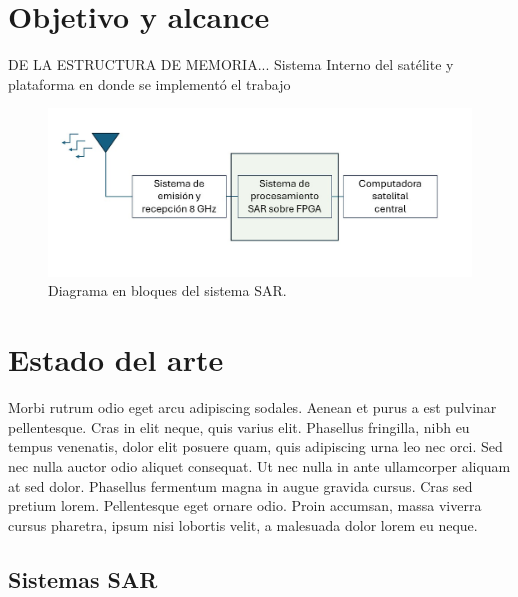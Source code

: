 \section{Objetivo y alcance}

DE LA ESTRUCTURA DE MEMORIA... Sistema Interno del satélite y plataforma en donde se implementó el trabajo

\begin{figure}[htpb]
\centering 
\includegraphics[width=.95\textwidth]{./Figuras/Diagrama Bloque Sistema.jpg}
\caption{Diagrama en bloques del sistema SAR.}
\label{fig:diagBloques}
\end{figure}

\vspace{25px}


\section{Estado del arte}
Morbi rutrum odio eget arcu adipiscing sodales. Aenean et purus a est pulvinar pellentesque. Cras in elit neque, quis varius elit. Phasellus fringilla, nibh eu tempus venenatis, dolor elit posuere quam, quis adipiscing urna leo nec orci. Sed nec nulla auctor odio aliquet consequat. Ut nec nulla in ante ullamcorper aliquam at sed dolor. Phasellus fermentum magna in augue gravida cursus. Cras sed pretium lorem. Pellentesque eget ornare odio. Proin accumsan, massa viverra cursus pharetra, ipsum nisi lobortis velit, a malesuada dolor lorem eu neque.


\subsection{Sistemas SAR}

